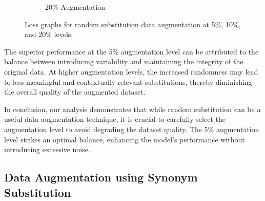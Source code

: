 \documentclass{article}
\begin{document}
\begin{figure}[h]
\begin{subfigure}[b]{0.3\textwidth}
    \caption{20\% Augmentation}
    \label{fig:random_20}
  \end{subfigure}
  \caption{Loss graphs for random substitution data augmentation at 5\%, 10\%, and 20\% levels.}
  \label{fig:random_substitution_loss}
\end{figure}

The superior performance at the 5\% augmentation level can be attributed to the
balance between introducing variability and maintaining the integrity of the
original data. At higher augmentation levels, the increased randomness may lead
to less meaningful and contextually relevant substitutions, thereby diminishing
the overall quality of the augmented dataset.

In conclusion, our analysis demonstrates that while random substitution can be
a useful data augmentation technique, it is crucial to carefully select the
augmentation level to avoid degrading the dataset quality. The 5\% augmentation
level strikes an optimal balance, enhancing the model's performance without
introducing excessive noise.

\subsection{Data Augmentation using Synonym Substitution}
\end{document}
